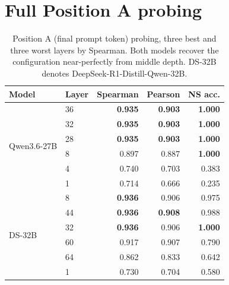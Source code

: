 \documentclass{article} %
\begin{document}
\section{Full Position A probing}
\label{app:posA-full}
\begin{table}[h]
  \centering
  \caption{Position A (final prompt token) probing, three best and three worst layers by Spearman. Both models recover the configuration near-perfectly from middle depth. DS-32B denotes DeepSeek-R1-Distill-Qwen-32B.}
  \label{tab:posA}
  \begin{tabular}{llrrr}
    \toprule
    \textbf{Model} & \textbf{Layer} & \textbf{Spearman} & \textbf{Pearson} & \textbf{NS acc.} \\
    \midrule
    \multirow{6}{*}{Qwen3.6-27B} & 36 & \textbf{0.935} & \textbf{0.903} & \textbf{1.000} \\
    & 32 & \textbf{0.935} & \textbf{0.903} & \textbf{1.000} \\
    & 28 & \textbf{0.935} & \textbf{0.903} & \textbf{1.000} \\
    & 8  & 0.897 & 0.887 & \textbf{1.000} \\
    & 4  & 0.740 & 0.703 & 0.383 \\
    & 1  & 0.714 & 0.666 & 0.235 \\
    \midrule
    \multirow{6}{*}{DS-32B} & 8  & \textbf{0.936} & 0.906 & 0.975 \\
    & 44 & \textbf{0.936} & \textbf{0.908} & 0.988 \\
    & 32 & \textbf{0.936} & 0.906 & \textbf{1.000} \\
    & 60 & 0.917 & 0.907 & 0.790 \\
    & 64 & 0.862 & 0.833 & 0.642 \\
    & 1  & 0.730 & 0.704 & 0.580 \\
    \bottomrule
  \end{tabular}
\end{table}
\end{document}
